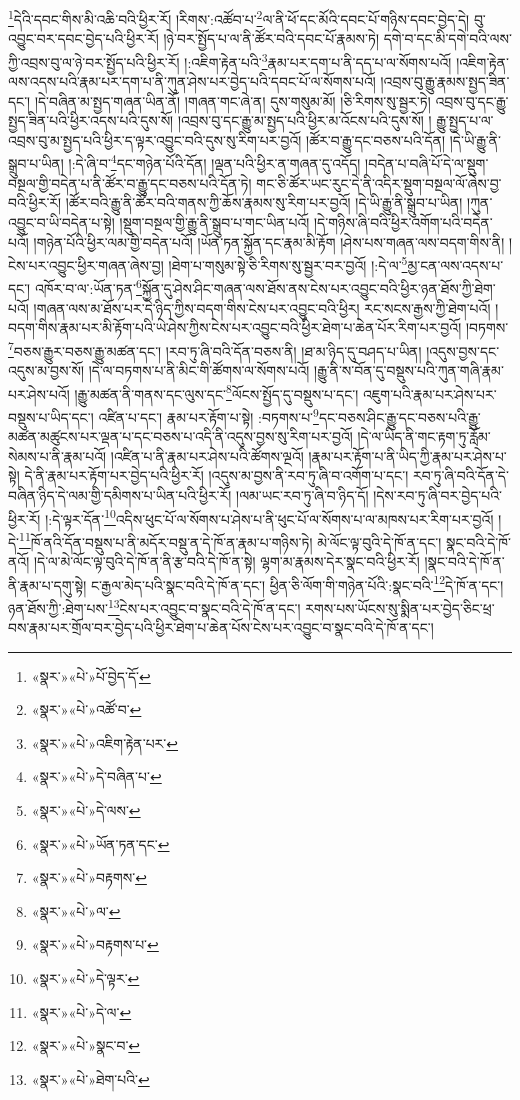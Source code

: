 \footnote{«སྣར་»«པེ་»པོ་བྱེད་དོ་}དེའི་དབང་གིས་མི་འཆི་བའི་ཕྱིར་རོ། །རིགས་:འཚོབ་པ་\footnote{«སྣར་»«པེ་»འཚོ་བ་}ལ་ནི་ཕོ་དང་མོའི་དབང་པོ་གཉིས་དབང་བྱེད་དེ། བུ་འབྱུང་བར་དབང་བྱེད་པའི་ཕྱིར་རོ། །ཉེ་བར་སྤྱོད་པ་ལ་ནི་ཚོར་བའི་དབང་པོ་རྣམས་ཏེ། དགེ་བ་དང་མི་དགེ་བའི་ལས་ཀྱི་འབྲས་བུ་ལ་ཉེ་བར་སྤྱོད་པའི་ཕྱིར་རོ། །:འཇིག་རྟེན་པའི་\footnote{«སྣར་»«པེ་»འཇིག་རྟེན་པར་}རྣམ་པར་དག་པ་ནི་དད་པ་ལ་སོགས་པའོ། །འཇིག་རྟེན་ལས་འདས་པའི་རྣམ་པར་དག་པ་ནི་ཀུན་ཤེས་པར་བྱེད་པའི་དབང་པོ་ལ་སོགས་པའོ། །འབྲས་བུ་རྒྱུ་རྣམས་སྤྱད་ཟིན་དང་། །དེ་བཞིན་མ་སྤྱད་གཞན་ཡིན་ནོ། །གཞན་གང་ཞེ་ན། དུས་གསུམ་མོ། །ཅི་རིགས་སུ་སྦྱར་ཏེ། འབྲས་བུ་དང་རྒྱུ་སྤྱད་ཟིན་པའི་ཕྱིར་འདས་པའི་དུས་སོ། །འབྲས་བུ་དང་རྒྱུ་མ་སྤྱད་པའི་ཕྱིར་མ་འོངས་པའི་དུས་སོ། །
རྒྱུ་སྤྱད་པ་ལ་འབྲས་བུ་མ་སྤྱད་པའི་ཕྱིར་ད་ལྟར་འབྱུང་བའི་དུས་སུ་རིག་པར་བྱའོ། །ཚོར་བ་རྒྱུ་དང་བཅས་པའི་དོན། །དེ་ཡི་རྒྱུ་ནི་སྒྲུབ་པ་ཡིན། །:དེ་ཞི་བ་\footnote{«སྣར་»«པེ་»དེ་བཞིན་པ་}དང་གཉེན་པོའི་དོན། །ལྡན་པའི་ཕྱིར་ན་གཞན་དུ་འདོད། །བདེན་པ་བཞི་པོ་དེ་ལ་སྡུག་བསྔལ་གྱི་བདེན་པ་ནི་ཚོར་བ་རྒྱུ་དང་བཅས་པའི་དོན་ཏེ། གང་ཅི་ཚོར་ཡང་རུང་དེ་ནི་འདིར་སྡུག་བསྔལ་ལོ་ཞེས་བྱ་བའི་ཕྱིར་རོ། །ཚོར་བའི་རྒྱུ་ནི་ཚོར་བའི་གནས་ཀྱི་ཆོས་རྣམས་སུ་རིག་པར་བྱའོ། །དེ་ཡི་རྒྱུ་ནི་སྒྲུབ་པ་ཡིན། །ཀུན་འབྱུང་བ་ཡི་བདེན་པ་སྟེ། །སྡུག་བསྔལ་གྱི་རྒྱུ་ནི་སྒྲུབ་པ་གང་ཡིན་པའོ། །དེ་གཉིས་ཞི་བའི་ཕྱིར་འགོག་པའི་བདེན་པའོ། །གཉེན་པོའི་ཕྱིར་ལམ་གྱི་བདེན་པའོ། །ཡོན་ཏན་སྐྱོན་དང་རྣམ་མི་རྟོག །ཤེས་པས་གཞན་ལས་བདག་གིས་ནི། །ངེས་པར་འབྱུང་ཕྱིར་གཞན་ཞེས་བྱ། །ཐེག་པ་གསུམ་སྟེ་ཅི་རིགས་སུ་སྦྱར་བར་བྱའོ། །:དེ་ལ་\footnote{«སྣར་»«པེ་»དེ་ལས་}མྱ་ངན་ལས་འདས་པ་དང་། འཁོར་བ་ལ་:ཡོན་ཏན་\footnote{«སྣར་»«པེ་»ཡོན་ཏན་དང་}སྐྱོན་དུ་ཤེས་ཤིང་གཞན་ལས་ཐོས་ནས་ངེས་པར་འབྱུང་བའི་ཕྱིར་ཉན་ཐོས་ཀྱི་ཐེག་པའོ། །གཞན་ལས་མ་ཐོས་པར་དེ་ཉིད་ཀྱིས་བདག་གིས་ངེས་པར་འབྱུང་བའི་ཕྱིར། རང་སངས་རྒྱས་ཀྱི་ཐེག་པའོ། །བདག་གིས་རྣམ་པར་མི་རྟོག་པའི་ཡེ་ཤེས་ཀྱིས་ངེས་པར་འབྱུང་བའི་ཕྱིར་ཐེག་པ་ཆེན་པོར་རིག་པར་བྱའོ། །བཏགས་\footnote{«སྣར་»«པེ་»བརྟགས་}བཅས་རྒྱུར་བཅས་རྒྱུ་མཚན་དང་། །རབ་ཏུ་ཞི་བའི་དོན་བཅས་ནི། །ཐ་མ་ཉིད་དུ་བཤད་པ་ཡིན། །འདུས་བྱས་དང་འདུས་མ་བྱས་སོ། །དེ་ལ་བཏགས་པ་ནི་མིང་གི་ཚོགས་ལ་སོགས་པའོ། །རྒྱུ་ནི་ས་བོན་དུ་བསྡུས་པའི་ཀུན་གཞི་རྣམ་པར་ཤེས་པའོ། །རྒྱུ་མཚན་ནི་གནས་དང་ལུས་དང་\footnote{«སྣར་»«པེ་»ལ་}ལོངས་སྤྱོད་དུ་བསྡུས་པ་དང་། འཇུག་པའི་རྣམ་པར་ཤེས་པར་བསྡུས་པ་ཡིད་དང་། འཛིན་པ་དང་། རྣམ་པར་རྟོག་པ་སྟེ། :བཏགས་པ་\footnote{«སྣར་»«པེ་»བརྟགས་པ་}དང་བཅས་ཤིང་རྒྱུ་དང་བཅས་པའི་རྒྱུ་མཚན་མཚུངས་པར་ལྡན་པ་དང་བཅས་པ་འདི་ནི་འདུས་བྱས་སུ་རིག་པར་བྱའོ། །དེ་ལ་ཡིད་ནི་གང་རྟག་ཏུ་རློམ་སེམས་པ་ནི་རྣམ་པའོ། །འཛིན་པ་ནི་རྣམ་པར་ཤེས་པའི་ཚོགས་ལྔའོ། །རྣམ་པར་རྟོག་པ་ནི་ཡིད་ཀྱི་རྣམ་པར་ཤེས་པ་སྟེ། དེ་ནི་རྣམ་པར་རྟོག་པར་བྱེད་པའི་ཕྱིར་རོ། །འདུས་མ་བྱས་ནི་རབ་ཏུ་ཞི་བ་འགོག་པ་དང་། རབ་ཏུ་ཞི་བའི་དོན་དེ་བཞིན་ཉིད་དེ་ལམ་གྱི་དམིགས་པ་ཡིན་པའི་ཕྱིར་རོ། །ལམ་ཡང་རབ་ཏུ་ཞི་བ་ཉིད་དོ། །དེས་རབ་ཏུ་ཞི་བར་བྱེད་པའི་ཕྱིར་རོ། །:དེ་ལྟར་དོན་\footnote{«སྣར་»«པེ་»དེ་ལྟར་}འདིས་ཕུང་པོ་ལ་སོགས་པ་ཤེས་པ་ནི་ཕུང་པོ་ལ་སོགས་པ་ལ་མཁས་པར་རིག་པར་བྱའོ། །དེ་\footnote{«སྣར་»«པེ་»དེ་ལ་}ཁོ་ནའི་དོན་བསྡུས་པ་ནི་མདོར་བསྡུ་ན་དེ་ཁོ་ན་རྣམ་པ་གཉིས་ཏེ། མེ་ལོང་ལྟ་བུའི་དེ་ཁོ་ན་དང་། སྣང་བའི་དེ་ཁོ་ནའོ། །དེ་ལ་མེ་ལོང་ལྟ་བུའི་དེ་ཁོ་ན་ནི་རྩ་བའི་དེ་ཁོ་ན་སྟེ། ལྷག་མ་རྣམས་དེར་སྣང་བའི་ཕྱིར་རོ། །སྣང་བའི་དེ་ཁོ་ན་ནི་རྣམ་པ་དགུ་སྟེ། ང་རྒྱལ་མེད་པའི་སྣང་བའི་དེ་ཁོ་ན་དང་། ཕྱིན་ཅི་ལོག་གི་གཉེན་པོའི་:སྣང་བའི་\footnote{«སྣར་»«པེ་»སྣང་བ་}དེ་ཁོ་ན་དང་། ཉན་ཐོས་ཀྱི་:ཐེག་པས་\footnote{«སྣར་»«པེ་»ཐེག་པའི་}ངེས་པར་འབྱུང་བ་སྣང་བའི་དེ་ཁོ་ན་དང་། རགས་པས་ཡོངས་སུ་སྨིན་པར་བྱེད་ཅིང་ཕྲ་བས་རྣམ་པར་གྲོལ་བར་བྱེད་པའི་ཕྱིར་ཐེག་པ་ཆེན་པོས་ངེས་པར་འབྱུང་བ་སྣང་བའི་དེ་ཁོ་ན་དང་། 